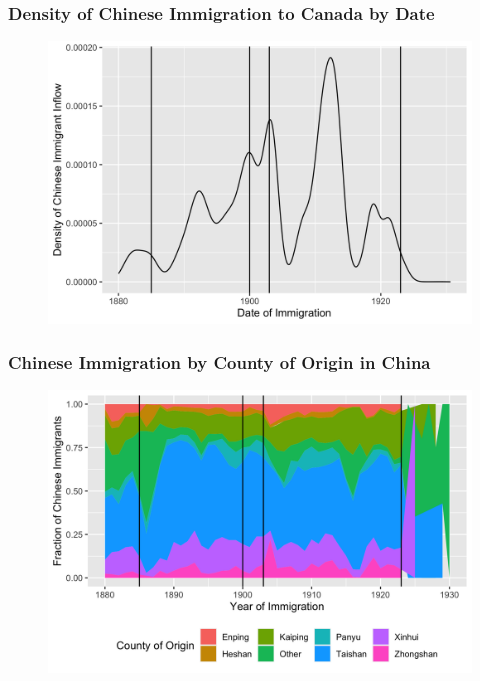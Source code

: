 \documentclass[pdf]{beamer}
\begin{document}

\begin{frame}[label = dateimmchi]
	\frametitle{Density of Chinese Immigration to Canada by Date}
    \centering
	\begin{figure}[H]
		\begin{center}
			\includegraphics[width=\textwidth]{../../figs/dateimmchi.png}
		\end{center}
	\end{figure}
    \hyperlink{yrimmchi}{}
\end{frame}

\begin{frame}[label = originchi]
	\frametitle{Chinese Immigration by County of Origin in China}
    \centering
	\begin{figure}[H]
		\begin{center}
			\includegraphics[width=\textwidth]{../../figs/chiorig.png}
		\end{center}
	\end{figure}
    \hyperlink{events1912}{}
\end{frame}
\end{document}
